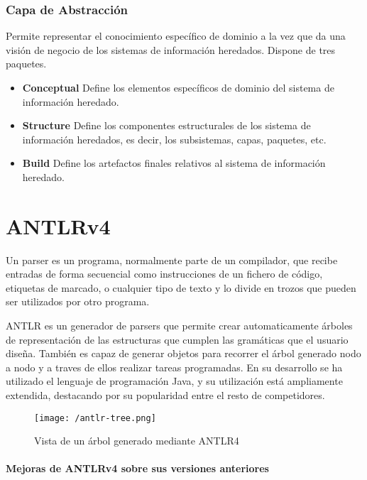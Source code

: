 {\subsubsection{Capa de Abstracción}
Permite representar el conocimiento específico de dominio a la vez que da una visión de negocio de los sistemas de
información heredados. Dispone de tres paquetes.
\begin{itemize}
\item \textbf{Conceptual} Define los elementos específicos de dominio del sistema de información heredado.
\item \textbf{Structure} Define los componentes estructurales de los sistema de información heredados, es decir, los subsistemas, capas, paquetes, etc.
\item \textbf{Build} Define los artefactos finales relativos al sistema de información heredado.
\end{itemize}

\section{ANTLRv4} \label{sec:ANTLRv4}
Un parser es un programa, normalmente parte de un compilador, que recibe entradas de forma secuencial como instrucciones de un fichero de código,
etiquetas de marcado, o cualquier tipo de texto y lo divide en trozos que pueden ser utilizados por otro programa.

ANTLR es un generador de parsers que permite crear automaticamente árboles de representación de las estructuras que cumplen las gramáticas que el usuario
diseña. También es capaz de generar objetos para recorrer el árbol generado nodo a nodo y a traves de ellos realizar tareas programadas.
En su desarrollo se ha utilizado el lenguaje de programación Java, y su utilización está ampliamente extendida, destacando por su popularidad entre el resto
de competidores. 

\begin{figure}[!h]
\begin{center}
\texttt{[image: /antlr-tree.png]}
\caption{Vista de un árbol generado mediante ANTLR4}
\label{fig:arbol-antlr}
\end{center}
\end{figure}

\paragraph{Mejoras de ANTLRv4 sobre sus versiones anteriores}

}
